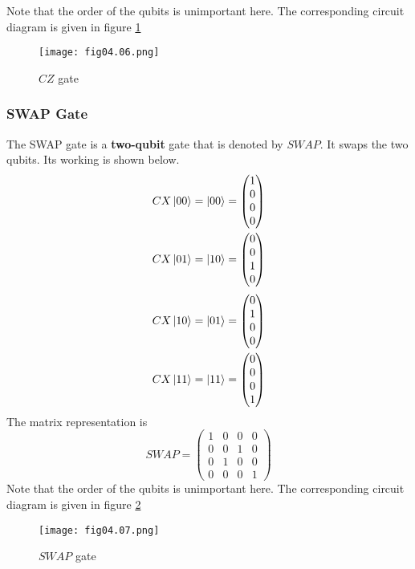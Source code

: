 Note that the order of the qubits is unimportant here. The corresponding circuit diagram is given in figure \ref{Fig:4.6}
\begin{figure}[!htb]
   \begin{minipage}{\textwidth}
     \centering
     \texttt{[image: fig04.06.png]}
     \caption{$CZ$ gate}
     \label{Fig:4.6}
   \end{minipage}
\end{figure}

\subsubsection*{SWAP Gate}
The SWAP gate is a \textbf{two-qubit} gate that is denoted by $SWAP$. It swaps the two qubits. Its working is shown below.
\begin{equation*}
\begin{split}
CX\left\vert 00\right\rangle&=\left\vert 00\right\rangle=
\begin{pmatrix}
1\\
0\\
0\\
0
\end{pmatrix}\\
CX\left\vert 01\right\rangle&=\left\vert 10\right\rangle=
\begin{pmatrix}
0\\
0\\
1\\
0
\end{pmatrix}
\end{split}
\end{equation*}
\begin{equation*}
\begin{split}
CX\left\vert 10\right\rangle&=\left\vert 01\right\rangle=
\begin{pmatrix}
0\\
1\\
0\\
0
\end{pmatrix}\\
CX\left\vert 11\right\rangle&=\left\vert 11\right\rangle=
\begin{pmatrix}
0\\
0\\
0\\
1
\end{pmatrix}\\
\end{split}
\end{equation*}
The matrix representation is
\begin{equation*}
SWAP=
\begin{pmatrix}
1&0&0&0\\
0&0&1&0\\
0&1&0&0\\
0&0&0&1
\end{pmatrix}
\end{equation*}
Note that the order of the qubits is unimportant here. The corresponding circuit diagram is given in figure \ref{Fig:4.7}
\begin{figure}[!htb]
   \begin{minipage}{\textwidth}
     \centering
     \texttt{[image: fig04.07.png]}
     \caption{$SWAP$ gate}
     \label{Fig:4.7}
   \end{minipage}
\end{figure}

